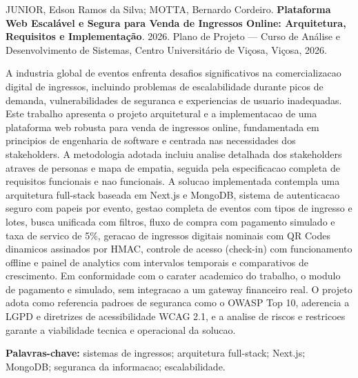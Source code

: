 \begin{resumo}

JUNIOR, Edson Ramos da Silva; MOTTA, Bernardo Cordeiro. \textbf{Plataforma Web Escalável e Segura para Venda de Ingressos Online: Arquitetura, Requisitos e Implementação}. 2026. Plano de Projeto — Curso de Análise e Desenvolvimento de Sistemas, Centro Universitário de Viçosa, Viçosa, 2026.

A industria global de eventos enfrenta desafios significativos na comercializacao digital de ingressos, incluindo problemas de escalabilidade durante picos de demanda, vulnerabilidades de seguranca e experiencias de usuario inadequadas. Este trabalho apresenta o projeto arquitetural e a implementacao de uma plataforma web robusta para venda de ingressos online, fundamentada em principios de engenharia de software e centrada nas necessidades dos stakeholders. A metodologia adotada incluiu analise detalhada dos stakeholders atraves de personas e mapa de empatia, seguida pela especificacao completa de requisitos funcionais e nao funcionais. A solucao implementada contempla uma arquitetura full-stack baseada em Next.js e MongoDB, sistema de autenticacao seguro com papeis por evento, gestao completa de eventos com tipos de ingresso e lotes, busca unificada com filtros, fluxo de compra com pagamento simulado e taxa de servico de 5\%, geracao de ingressos digitais nominais com QR Codes dinamicos assinados por HMAC, controle de acesso (check-in) com funcionamento offline e painel de analytics com intervalos temporais e comparativos de crescimento. Em conformidade com o carater academico do trabalho, o modulo de pagamento e simulado, sem integracao a um gateway financeiro real. O projeto adota como referencia padroes de seguranca como o OWASP Top 10, aderencia a LGPD e diretrizes de acessibilidade WCAG 2.1, e a analise de riscos e restricoes garante a viabilidade tecnica e operacional da solucao.

\textbf{Palavras-chave:} sistemas de ingressos; arquitetura full-stack; Next.js; MongoDB; seguranca da informacao; escalabilidade.

\end{resumo}
